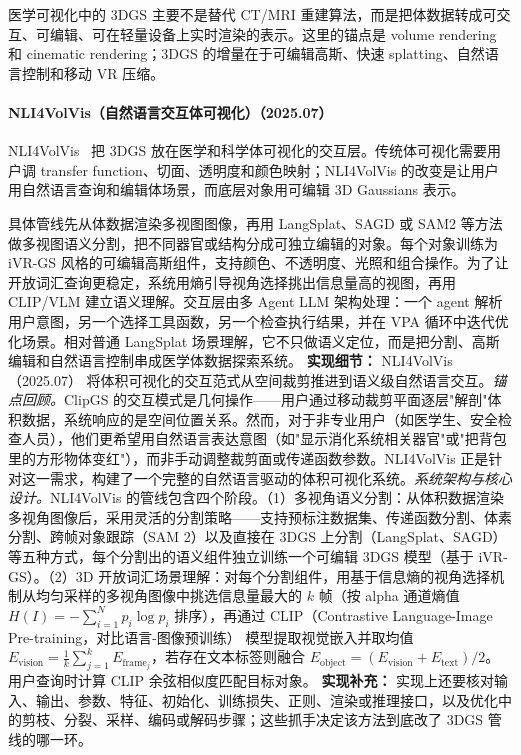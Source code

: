 医学可视化中的 3DGS 主要不是替代 CT/MRI 重建算法，而是把体数据转成可交互、可编辑、可在轻量设备上实时渲染的表示。这里的锚点是 volume rendering 和 cinematic rendering；3DGS 的增量在于可编辑高斯、快速 splatting、自然语言控制和移动 VR 压缩。


\paragraph{NLI4VolVis（自然语言交互体可视化）（2025.07）}
NLI4VolVis~\cite{2507_12621} 把 3DGS 放在医学和科学体可视化的交互层。传统体可视化需要用户调 transfer function、切面、透明度和颜色映射；NLI4VolVis 的改变是让用户用自然语言查询和编辑体场景，而底层对象用可编辑 3D Gaussians 表示。

具体管线先从体数据渲染多视图图像，再用 LangSplat、SAGD 或 SAM2 等方法做多视图语义分割，把不同器官或结构分成可独立编辑的对象。每个对象训练为 iVR-GS 风格的可编辑高斯组件，支持颜色、不透明度、光照和组合操作。为了让开放词汇查询更稳定，系统用熵引导视角选择挑出信息量高的视图，再用 CLIP/VLM 建立语义理解。交互层由多 Agent LLM 架构处理：一个 agent 解析用户意图，另一个选择工具函数，另一个检查执行结果，并在 VPA 循环中迭代优化场景。相对普通 LangSplat 场景理解，它不只做语义定位，而是把分割、高斯编辑和自然语言控制串成医学体数据探索系统。
\textbf{实现细节：} NLI4VolVis（2025.07） 将体积可视化的交互范式从空间裁剪推进到语义级自然语言交互。\textit{锚点回顾。}ClipGS 的交互模式是几何操作——用户通过移动裁剪平面逐层"解剖"体积数据，系统响应的是空间位置关系。然而，对于非专业用户（如医学生、安全检查人员），他们更希望用自然语言表达意图（如"显示消化系统相关器官"或"把背包里的方形物体变红"），而非手动调整裁剪面或传递函数参数。NLI4VolVis 正是针对这一需求，构建了一个完整的自然语言驱动的体积可视化系统。\textit{系统架构与核心设计。}NLI4VolVis 的管线包含四个阶段。（1）多视角语义分割：从体积数据渲染多视角图像后，采用灵活的分割策略——支持预标注数据集、传递函数分割、体素分割、跨帧对象跟踪（SAM 2）以及直接在 3DGS 上分割（LangSplat、SAGD）等五种方式，每个分割出的语义组件独立训练一个可编辑 3DGS 模型（基于 iVR-GS）。（2）3D 开放词汇场景理解：对每个分割组件，用基于信息熵的视角选择机制从均匀采样的多视角图像中挑选信息量最大的 $k$ 帧（按 alpha 通道熵值 $H(I)=-\sum_{i=1}^{N} p_i \log p_i$ 排序），再通过 CLIP（Contrastive Language-Image Pre-training，对比语言-图像预训练） 模型提取视觉嵌入并取均值 $E_{\mathrm{vision}} = \frac{1}{k}\sum_{j=1}^{k} E_{\mathrm{frame}_j}$，若存在文本标签则融合 $E_{\mathrm{object}} = (E_{\mathrm{vision}} + E_{\mathrm{text}})/2$。用户查询时计算 CLIP 余弦相似度匹配目标对象。
\textbf{实现补充：} 实现上还要核对输入、输出、参数、特征、初始化、训练损失、正则、渲染或推理接口，以及优化中的剪枝、分裂、采样、编码或解码步骤；这些抓手决定该方法到底改了 3DGS 管线的哪一环。
